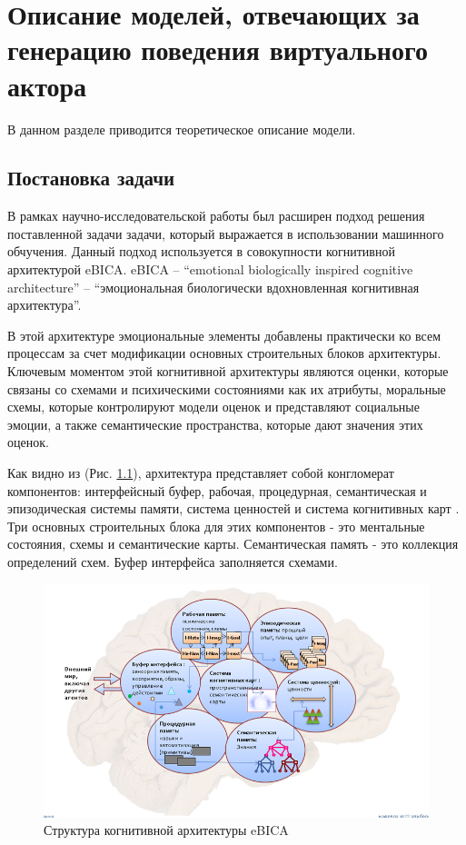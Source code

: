 \chapter{Описание моделей, отвечающих за генерацию поведения виртуального актора}


В данном разделе приводится теоретическое описание модели.

\section{Постановка задачи}
В рамках научно-исследовательской работы был расширен подход решения поставленной задачи задачи, который выражается в
использовании машинного обчучения. Данный подход используется в совокупности когнитивной архитектурой eBICA. 
eBICA – “emotional biologically inspired cognitive architecture” – “эмоциональная биологически вдохновленная когнитивная архитектура”. 

В этой архитектуре эмоциональные элементы добавлены практически ко всем процессам за счет модификации основных строительных блоков архитектуры. 
Ключевым моментом этой когнитивной архитектуры являются оценки, которые связаны со схемами и психическими состояниями как их атрибуты, 
моральные схемы, которые контролируют модели оценок и представляют социальные эмоции, а также семантические пространства, которые дают 
значения этих оценок.

Как видно из (Рис. \ref{pic:ris7}), архитектура представляет собой конгломерат компонентов: интерфейсный буфер, рабочая, процедурная, семантическая 
и эпизодическая системы памяти, система ценностей и система когнитивных карт \cite{Samsonovich01}. Три основных строительных блока для этих компонентов - это 
ментальные состояния, схемы и семантические карты. Семантическая память - это коллекция определений схем. Буфер интерфейса заполняется схемами.

\begin{figure}[h]
\includegraphics[width=0.75\columnwidth]{./img/ris7.png}
\centering  
\caption{Структура когнитивной архитектуры eBICA}
\label{pic:ris7}
\end{figure}

